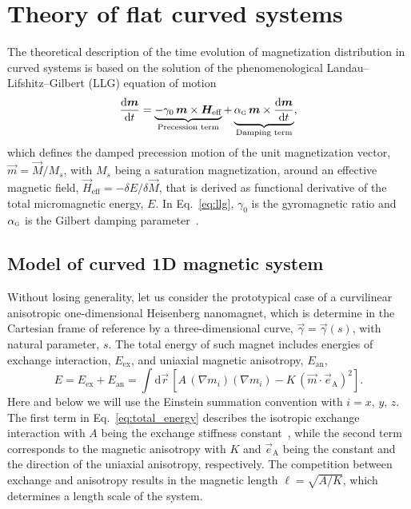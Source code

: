 \section{Theory of flat curved systems}\label{sec:theory_1D}

The theoretical description of the time evolution of magnetization distribution in curved systems is based on the solution of the phenomenological Landau--Lifshitz--Gilbert (LLG) equation of motion~\cite{Landau35,Gilbert04}
\begin{equation}\label{eq:llg}
\frac{\mathrm{d}\vec{m}}{\mathrm{d}t}=\underbrace{-\gamma_0\, \vec{m}\times\vec{H}_\textrm{eff}}_{\text{Precession term}} + \underbrace{\alpha_\textsc{g}\, \vec{m}\times\frac{\mathrm{d}\vec{m}}{\mathrm{d}t}}_{\text{Damping term}},
\end{equation}
which defines the damped precession motion of the unit magnetization vector, $\vec{m}=\vec{M}/M_s$, with $M_s$ being a saturation magnetization, around an effective magnetic field, $\vec{H}_\textrm{eff}=-\delta E/\delta\vec{M}$, that is derived as functional derivative of the total micromagnetic energy, $E$. In Eq.~\eqref{eq:llg}, $\gamma_0$ is the gyromagnetic ratio and $\alpha_\textsc{g}$ is the Gilbert damping parameter~\cite{Gilbert04}.



\subsection{Model of curved 1D magnetic system}\label{sec:model_1D}

Without losing generality, let us consider the prototypical case of a curvilinear anisotropic one-dimensional Heisenberg nanomagnet, which is determine in the Cartesian frame of reference by a three-dimensional curve, $\vec{\gamma}=\vec{\gamma}(s)$, with natural parameter, $s$. The total energy of such magnet includes energies of exchange interaction, $E_\textrm{ex}$, and uniaxial magnetic anisotropy, $E_\textrm{an}$,
\begin{equation}\label{eq:total_energy}
E=E_\textrm{ex} + E_\textrm{an} =\int\mathrm{d}\vec{r}\, \left[A \, (\nabla m_i)(\nabla m_i)-K \, (\vec{m}\cdot \vec{e}_\mathrm{A})^2 \right].
\end{equation}
Here and below we will use the Einstein summation convention with $i = x,\,y,\,z$. The first term in Eq.~\eqref{eq:total_energy} describes the isotropic exchange interaction with $A$ being the exchange stiffness constant~\cite{Brown63}, while the second term corresponds to the magnetic anisotropy with $K$ and $\vec{e}_\mathrm{A}$ being the constant and the direction of the uniaxial anisotropy, respectively. The competition between exchange and anisotropy results in the magnetic length $\ell=\sqrt{A/K}$, which determines a length scale of the system.

